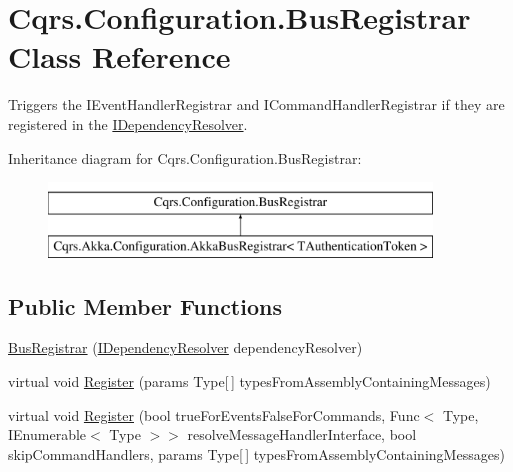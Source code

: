 \hypertarget{classCqrs_1_1Configuration_1_1BusRegistrar}{}\section{Cqrs.\+Configuration.\+Bus\+Registrar Class Reference}
\label{classCqrs_1_1Configuration_1_1BusRegistrar}


Triggers the I\+Event\+Handler\+Registrar and I\+Command\+Handler\+Registrar if they are registered in the \hyperlink{interfaceCqrs_1_1Configuration_1_1IDependencyResolver}{I\+Dependency\+Resolver}.  


Inheritance diagram for Cqrs.\+Configuration.\+Bus\+Registrar\+:\begin{figure}[H]
\begin{center}
\leavevmode
\includegraphics[height=2.000000cm]{classCqrs_1_1Configuration_1_1BusRegistrar}
\end{center}
\end{figure}
\subsection*{Public Member Functions}
\begin{DoxyCompactItemize}
\item 
\hyperlink{classCqrs_1_1Configuration_1_1BusRegistrar_a4a934d21a535b28af6c67154512bba20}{Bus\+Registrar} (\hyperlink{interfaceCqrs_1_1Configuration_1_1IDependencyResolver}{I\+Dependency\+Resolver} dependency\+Resolver)
\item 
virtual void \hyperlink{classCqrs_1_1Configuration_1_1BusRegistrar_ab8deb04dc9cb6b80f32b54c847dfb1b3}{Register} (params Type\mbox{[}$\,$\mbox{]} types\+From\+Assembly\+Containing\+Messages)
\item 
virtual void \hyperlink{classCqrs_1_1Configuration_1_1BusRegistrar_abc3af2b8dfeeb49f5e5461456ae01f67}{Register} (bool true\+For\+Events\+False\+For\+Commands, Func$<$ Type, I\+Enumerable$<$ Type $>$$>$ resolve\+Message\+Handler\+Interface, bool skip\+Command\+Handlers, params Type\mbox{[}$\,$\mbox{]} types\+From\+Assembly\+Containing\+Messages)
\end{DoxyCompactItemize}
